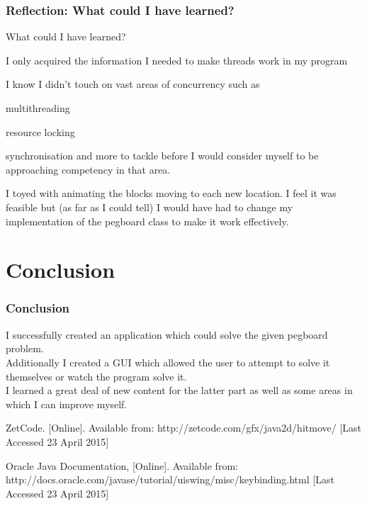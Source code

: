 \documentclass{beamer}
\begin{document}
	\begin{frame}
		\frametitle{Reflection: What could I have learned?}
		What could I have learned?
		\blt
			\item I only acquired the information I needed to make threads work in my program
			\item I know I didn't touch on vast areas of concurrency such as
			\blt
				\item multithreading
				\item resource locking
				\item synchronisation
			\finblt 
			and more to tackle before I would consider myself to be approaching competency in that area. 
			\item I toyed with animating the blocks moving to each new location. I feel it was 
			feasible but (as far as I could tell) I would have had to change my implementation of the 
			pegboard class to make it work effectively. 
		\finblt
	\end{frame}
\section{Conclusion}	
	\begin{frame}
		\frametitle{Conclusion}
		I successfully created an application which could solve the given pegboard problem.\\\medskip
		Additionally I created a GUI which allowed the user to attempt to solve it themselves
		or watch the program solve it. \\\medskip
		I learned a great deal of new content for the latter part as well as some areas in which I can improve myself. 
		
		\bd{Resources Used:}
		\blt 
			\item ZetCode. [Online]. Available from: 
			http://zetcode.com/gfx/java2d/hitmove/ [Last Accessed 23 April 2015]

			\item Oracle Java Documentation, [Online]. Available from: 
			http://docs.oracle.com/javase/tutorial/uiswing/misc/keybinding.html [Last Accessed 23 April 2015]
		\finblt
	\end{frame}
\end{document}
